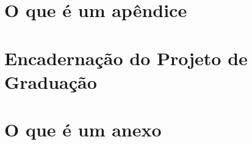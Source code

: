 \documentclass[a4paper,12pt,oneside,openany]{book}
\begin{document}
   \chapter{O que é um apêndice}
   \label{ApendiceA}
   
   \chapter{Encadernação do Projeto de Graduação}
   \label{ApendiceB}
   
   \chapter{O que é um anexo}
   \label{ApendiceC}
      

\backmatter
\end{document}
